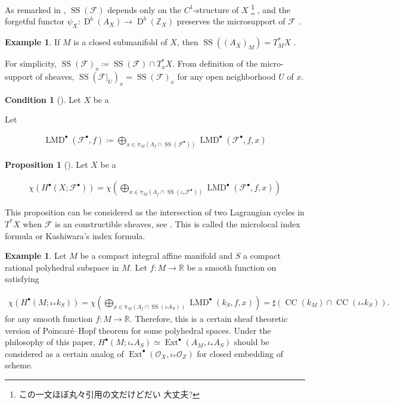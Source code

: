 \documentclass[a4paper,dvipdfmx,reqno,12pt]{amsart}
\theoremstyle{definition}
\newtheorem{example}[theorem]{Example}
\newtheorem{proposition}[theorem]{Proposition}
\newtheorem{condition}[theorem]{Condition}
\newcommand{\deq}{\coloneqq}
\newcommand{\Z}{\mathbb{Z}}%
\newcommand{\mcal}[1]{\mathcal{#1}}%
\newcommand{\opn}[1]{\operatorname{#1}}
\numberwithin{equation}{section}
\begin{document}
As remarked in \cite[Remark 5.1.6]{MR1299726},
$\opn{SS}(\mcal{F})$ depends only on the 
$C^{1}$-structure of $X$ \footnote{この一文ほぼ丸々引用の文だけどだい
大丈夫?}
, and the forgetful functor 
$\psi_X \colon \opn{D}^{b}(A_X)\to \opn{D}^{b}(\Z_X)$
preserves the microsupport of $\mcal{F}$ 
\cite[Remark 5.1.5]{MR1299726}.

\begin{example}
If $M$ is a closed submanifold of $X$, then
$\opn{SS}((A_{X})_M)=T^{*}_M X$ \cite[Proposition 5.3.2]{MR1299726}.
\end{example}
For simplicity,
$\opn{SS}(\mcal{F})_x\deq \opn{SS}(\mcal{F}) \cap T^{*}_x X$.
From definition of the micro-support of sheaves, 
$\opn{SS}(\mcal{F}|_{U})_x=\opn{SS}(\mcal{F})_x$
for any open neighborhood $U$ of $x$.

\begin{condition}[{\cite[Proposition 5.4.20]{MR1299726}}]
Let $X$ be a 
\end{condition}

Let 

\begin{align}
\opn{LMD}^{\bullet}(\mathcal{F}^{\bullet},f)\deq 
\bigoplus_{x\in \check{\pi}_{M}(
\Lambda_f\cap \opn{SS}(\mathcal{F}^{\bullet}))}
\opn{LMD}^{\bullet}(\mathcal{F}^{\bullet},f,x)
\end{align}


\begin{proposition}[{\cite[Proposition 5.4.20]{MR1299726}}]
Let $X$ be a 

\begin{align}
\chi(H^{\bullet}(X;\mathcal{F}^{\bullet}))=
\chi (\bigoplus_{x\in \check{\pi}_{M}(
\Lambda_f\cap \opn{SS}(\iota_*\mathcal{F}^{\bullet}))}
\opn{LMD}^{\bullet}(\mathcal{F}^{\bullet},f,x))
\end{align}

\end{proposition}
This proposition can be considered as the intersection 
of two Lagrangian cycles in $T^{*}X$ when 
$\mathcal{F}$ is an constructible sheaves,
see \cite[Corollary 9.5.2,Theorem 9.5.6]{MR1299726}.
This is called the microlocal index formula or Kashiwara's 
index formula.
\begin{example}
Let $M$ be a compact integral affine manifold and $S$  
a compact rational polyhedral subspace in $M$. 
Let $f\colon M \to \mathbb{R}$ be a smooth function on
satisfying 

\begin{align}
\chi(H^{\bullet}(M;\iota_*k_S))
=\chi(\bigoplus_{x\in \check{\pi}_{M}(\Lambda_f\cap \opn{SS}(\iota_*k_S))} \opn{LMD}^{\bullet}(k_S,f,x))
=\sharp (\opn{CC}(k_M)\cap \opn{CC}(\iota_* k_S)).
\end{align}
for any smooth function $f\colon M\to \mathbb{R}$.
Therefore, this is a certain sheaf theoretic version of 
Poincar\'e--Hopf theorem for some polyhedral spaces. Under
the philosophy of this paper, $H^{\bullet}(M;\iota_*A_S)\simeq 
\opn{Ext}^{\bullet}(A_M,\iota_*A_S)$
 should be considered as a
certain analog of 
$\opn{Ext}^{\bullet}(\mcal{O}_X,\iota_*\mcal{O}_Z)$ for closed embedding of 
scheme.
\end{example}
\end{document}
